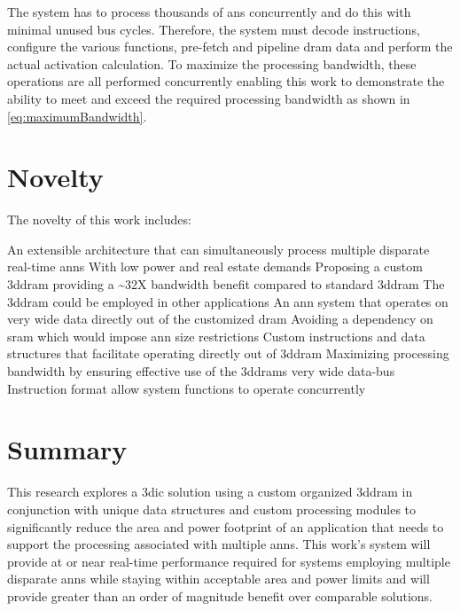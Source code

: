 The system has to process thousands of \acp{an} concurrently and do this with minimal unused bus cycles.
Therefore, the system must decode instructions, configure the various functions, pre-fetch and pipeline \ac{dram} data and perform the actual activation calculation. 
To maximize the processing bandwidth, these operations are all performed concurrently enabling this work to demonstrate the ability to meet and exceed the required \iffalse \SI[per-mode=symbol]{32}{\tera \bit \per \second} of\fi processing bandwidth as shown in \eqref{eq:maximumBandwidth}.

\iffalse
The problem associated with processing \acp{ann} are outlined in Section \ref{sec:The Problem}. 
\fi

\section[Novelty]{Novelty}
\label{sec:Novelty}

The novelty of this work includes:
\begin{outline}
    \1 An extensible architecture that can simultaneously process multiple disparate real-time \ac{ann}s 
      \2 With low power and real estate demands
    \1 Proposing a custom \ac{3ddram} providing a \textasciitilde 32X bandwidth benefit compared to standard \ac{3ddram}
      \2 The \ac{3ddram} could be employed in other applications
    \1 An \ac{ann} system that operates on very wide data directly out of the customized \ac{dram}
      \2 Avoiding a dependency on \ac{sram} which would impose \ac{ann} size restrictions
    \1 Custom instructions and data structures that facilitate operating directly out of \ac{3ddram} 
      \2 Maximizing processing bandwidth by ensuring effective use of the \acp{3ddram} very wide data-bus
      \2 Instruction format allow system functions to operate concurrently 
\end{outline}


\section[Summary]{Summary}
\label{sec:Summary}

This research explores a \ac{3dic} solution using a custom organized \ac{3ddram} in conjunction with unique data structures and custom processing modules to significantly reduce the 
area and power footprint of an application that needs to support the processing associated with multiple \ac{ann}s.
This work's system will provide at or near real-time performance required for systems employing multiple disparate \ac{ann}s while staying within acceptable area and power limits and will provide greater than an order of magnitude benefit over comparable solutions.

